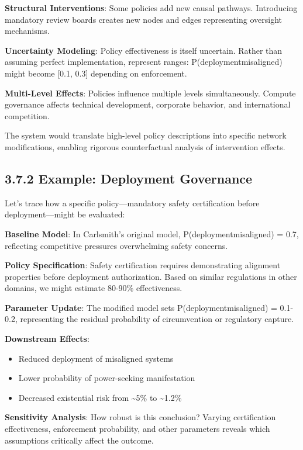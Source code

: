 \documentclass[
  11pt,
  letterpaper,
]{book}
\providecommand{\tightlist}{%
  \setlength{\itemsep}{0pt}\setlength{\parskip}{0pt}}
\begin{document}
\textbf{Structural Interventions}: Some policies add new causal
pathways. Introducing mandatory review boards creates new nodes and
edges representing oversight mechanisms.

\textbf{Uncertainty Modeling}: Policy effectiveness is itself uncertain.
Rather than assuming perfect implementation, represent ranges:
P(deployment\textbar misaligned) might become {[}0.1, 0.3{]} depending
on enforcement.

\textbf{Multi-Level Effects}: Policies influence multiple levels
simultaneously. Compute governance affects technical development,
corporate behavior, and international competition.

The system would translate high-level policy descriptions into specific
network modifications, enabling rigorous counterfactual analysis of
intervention effects.

\subsection{3.7.2 Example: Deployment
Governance}\label{sec-deployment-example}

Let's trace how a specific policy---mandatory safety certification
before deployment---might be evaluated:

\textbf{Baseline Model}: In Carlsmith's original model,
P(deployment\textbar misaligned) = 0.7, reflecting competitive pressures
overwhelming safety concerns.

\textbf{Policy Specification}: Safety certification requires
demonstrating alignment properties before deployment authorization.
Based on similar regulations in other domains, we might estimate 80-90\%
effectiveness.

\textbf{Parameter Update}: The modified model sets
P(deployment\textbar misaligned) = 0.1-0.2, representing the residual
probability of circumvention or regulatory capture.

\textbf{Downstream Effects}:

\begin{itemize}
\tightlist
\item
  Reduced deployment of misaligned systems
\item
  Lower probability of power-seeking manifestation
\item
  Decreased existential risk from \textasciitilde5\% to
  \textasciitilde1.2\%
\end{itemize}

\textbf{Sensitivity Analysis}: How robust is this conclusion? Varying
certification effectiveness, enforcement probability, and other
parameters reveals which assumptions critically affect the outcome.
\end{document}
